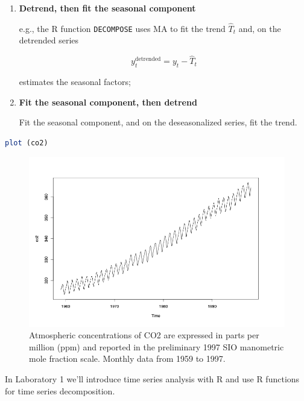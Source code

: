 \documentclass[dvipsnames,12pt]{book}
\begin{document}
            \begin{enumerate}
                \item \textbf{Detrend, then fit the seasonal component}

                    e.g., the R function \texttt{DECOMPOSE} uses MA to fit the trend \( \hat{T}_t \) and, on the detrended series

                    \begin{equation}
                        y_t^{\text{detrended}} = y_t - \hat{T}_t
                    \end{equation}

                    estimates the seasonal factors;

                \item \textbf{Fit the seasonal component, then detrend}

                    Fit the seasonal component, and on the deseasonalized series, fit the trend.

            \end{enumerate}

\begin{lstlisting}[language=R]
    plot (co2)
\end{lstlisting}

            \begin{figure}[ht]
                \centering
                \includegraphics[width=0.5\linewidth]{L1-4.png}
                \caption{Atmospheric concentrations of CO2 are expressed in parts per million (ppm) and reported in the preliminary 1997 SIO manometric mole fraction scale. Monthly data from 1959 to 1997.}
                \label{fig:L1-4}
            \end{figure}

            \begin{example}
                In Laboratory 1 we’ll introduce time series analysis with R and use R functions for time series decomposition.
            \end{example}

\end{document}
